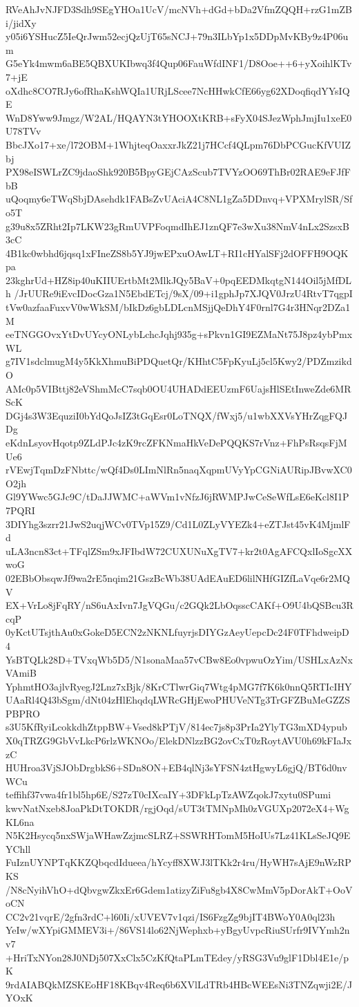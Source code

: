 RVeAhJvNJFD3Sdh9SEgYHOa1UcV/mcNVh+dGd+bDa2VfmZQQH+rzG1mZBi/jidXy
y05i6YSHucZ5IeQrJwm52ecjQzUjT65sNCJ+79n3ILbYp1x5DDpMvKBy9z4P06um
G5eYk4mwm6aBE5QBXUKIbwq3f4Qup06FauWfdINF1/D8Ooe++6+yXoihlKTv7+jE
oXdhc8CO7RJy6ofRhaKshWQIa1URjLScee7NcHHwkCfE66yg62XDoqfiqdYYsIQE
WnD8Yww9Jmgz/W2AL/HQAYN3tYHOOXtKRB+sFyX04SJezWphJmjIu1xeE0U78TVv
BbcJXo17+xe/l72OBM+1WhjteqOaxxrJkZ21j7HCcf4QLpm76DbPCGucKfVUIZbj
PX98eISWLrZC9jdaoShk920B5BpyGEjCAzScub7TVYzOO69ThBr02RAE9eFJfFbB
uQoqmy6eTWqSbjDAsehdk1FABsZvUAciA4C8NL1gZa5DDnvq+VPXMrylSR/Sfo5T
g39u8x5ZRht2Ip7LKW23gRmUVPFoqmdIhEJ1znQF7e3wXu38NmV4nLx2SzsxB3cC
4B1kc0wbhd6jqsq1xFIneZS8b5YJ9jwEPxuOAwLT+RI1cHYalSFj2dOFFH9OQKpa
23kghrUd+HZ8ip40uKIIUErtbMt2MlkJQy5BaV+0pqEEDMkqtgN144Oil5jMfDLh
/JrUURe9iEvcIDocGza1N5EbdETcj/9sX/09+i1gphJp7XJQV0JrzU4RtvT7qgpI
tVw0azfaaFuxvV0wWkSM/bIkDz6gbLDLcnMSjjQeDhY4F0rnl7G4r3HNqr2DZa1M
eeTNGGOvxYtDvUYcyONLybLchcJqhj935g+sPkvn1GI9EZMaNt75J8pz4ybPmxWL
g7IV1sdclmugM4y5KkXhmuBiPDQuetQr/KHhtC5FpKyuLj5cl5Kwy2/PDZmzikdO
AMc0p5VIBttj82eVShmMcC7sqb0OU4UHADdEEUzmF6UajsHlSEtInweZde6MRScK
DGj4s3W3EquziI0bYdQoJsIZ3tGqEsr0LoTNQX/fWxj5/u1wbXXVsYHrZqgFQJDg
eKdnLsyovHqotp9ZLdPJc4zK9rcZFKNmaHkVeDePQQKS7rVnz+FhPsRsqsFjMUe6
rVEwjTqmDzFNbttc/wQf4Ds0LImNlRn5naqXqpmUVyYpCGNiAURipJBvwXC0O2jh
Gl9YWwc5GJc9C/tDaJJWMC+aWVm1vNfzJ6jRWMPJwCeSeWfLsE6eKcl8I1P7PQRI
3DIYhg3szrr21JwS2uqjWCv0TVp15Z9/Cd1L0ZLyVYEZk4+eZTJst45vK4MjmlFd
uLA3ncn83ct+TFqlZSm9xJFIbdW72CUXUNuXgTV7+kr2t0AgAFCQxlIoSgcXXwoG
02EBbObsqwJf9wa2rE5nqim21GszBcWb38UAdEAuED6lilNHfGIZfLaVqe6r2MQV
EX+VrLo8jFqRY/nS6uAxIvn7JgVQGu/c2GQk2LbOqsscCAKf+O9U4bQSBcu3RcqP
0yKctUTsjthAu0xGokeD5ECN2zNKNLfuyrjsDIYGzAeyUepcDc24F0TFhdweipD4
YsBTQLk28D+TVxqWb5D5/N1sonaMaa57vCBw8Eo0vpwuOzYim/USHLxAzNxVAmiB
YphmtHO3ajlvRyegJ2Lnz7xBjk/8KrCTlwrGiq7Wtg4pMG7f7K6k0nnQ5RTIcIHY
UAaRl4Q43bSgm/dNt04zHlEhqdqLWRcGHjEwoPHUVeNTg3TrGFZBuMeGZZSPBPRO
s3U5KfRyiLcokkdhZtppBW+Vsed8kPTjV/814ec7js8p3PrIa2YlyTG3mXD4ypub
X0qTRZG9GbVvLkcP6rlzWKNOo/ElekDNlzzBG2ovCxT0zRoytAVU0h69kFIaJxzC
HUHroa3VjSJObDrgbkS6+SDn8ON+EB4qlNj3sYFSN4ztHgwyL6gjQ/BT6d0nvWCu
teffihf37vwa4fr1bl5hp6E/S27zT0cIXcaIY+3DFkLpTzAWZqokJ7xytu0SPumi
kwvNatNxeb8JoaPkDtTOKDR/rgjOqd/sUT3tTMNpMh0zVGUXp2072eX4+WgKL6na
N5K2Hsycq5nxSWjaWHawZzjmcSLRZ+SSWRHTomM5HoIUs7Lz41KLsSeJQ9EYChll
FuIznUYNPTqKKZQbqcdIdueea/hYcyff8XWJ3lTKk2r4ru/HyWH7sAjE9nWzRPKS
/N8cNyihVhO+dQbvgwZkxEr6Gdem1atizyZiFu8gb4X8CwMmV5pDorAkT+OoVoCN
CC2v21vqrE/2gfn3rdC+l60Ii/xUVEV7v1qzi/IS6FzgZg9bjIT4BWoY0A0ql23h
YeIw/wXYpiGMMEV3i+/86VS14lo62NjWephxb+yBgyUvpcRiuSUrfr9IVYmh2nv7
+HriTxNYon28J0NDj507XxClx5CzKfQtaPLmTEdey/yRSG3Vu9glF1Dbl4E1e/pK
9rdAIABQkMZSKEoHF18KBqv4Req6b6XVlLdTRb4HBcWEEsNi3TNZqwji2E/JYOxK
